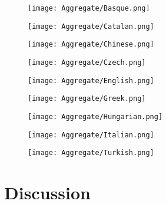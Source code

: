 \documentclass{article}
\begin{document}
\begin{figure}[H]
\centering
\texttt{[image: Aggregate/Basque.png]}
\label{fig:globfig}
\end{figure}

\begin{figure}[H]
\centering
\texttt{[image: Aggregate/Catalan.png]}
\label{fig:globfig}
\end{figure}

\begin{figure}[H]
\centering
\texttt{[image: Aggregate/Chinese.png]}
\label{fig:globfig}
\end{figure}

\begin{figure}[H]
\centering
\texttt{[image: Aggregate/Czech.png]}
\label{fig:globfig}
\end{figure}

\begin{figure}[H]
\centering
\texttt{[image: Aggregate/English.png]}
\label{fig:globfig}
\end{figure}

\begin{figure}[H]
\centering
\texttt{[image: Aggregate/Greek.png]}
\label{fig:globfig}
\end{figure}

\begin{figure}[H]
\centering
\texttt{[image: Aggregate/Hungarian.png]}
\label{fig:globfig}
\end{figure}

\begin{figure}[H]
\centering
\texttt{[image: Aggregate/Italian.png]}
\label{fig:globfig}
\end{figure}

\begin{figure}[H]
\centering
\texttt{[image: Aggregate/Turkish.png]}
\label{fig:globfig}
\end{figure}










\newpage

\section{Discussion}
\end{document}
